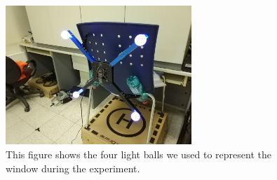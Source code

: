 \documentclass[ twoside, 12pt ]{article}
\begin{document}
\begin{figure} %
    \centerline{\includegraphics[width=70mm]{window_lights.jpg}}
    \caption{This figure shows the four light balls we used to represent the window during the experiment.}
    \label{fig:window_lights}
\end{figure}
\end{document}
